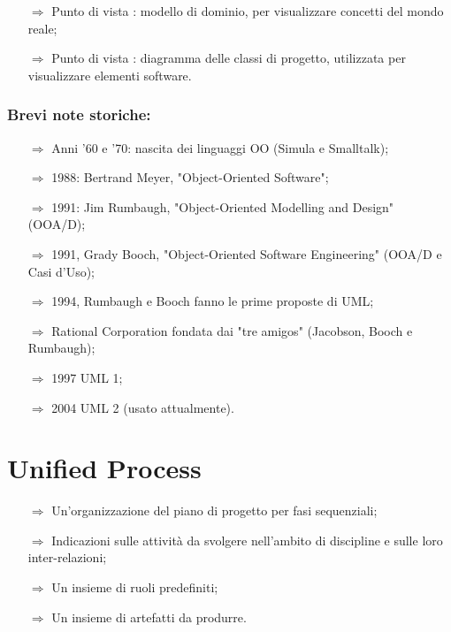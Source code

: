 \begin{itemize}
    \item [$\Rightarrow$] Punto di vista : modello 
    di dominio, per visualizzare concetti del mondo reale;
    \item [$\Rightarrow$] Punto di vista : diagramma
    delle classi di progetto, utilizzata per visualizzare elementi software.
\end{itemize}

\subsubsection{Brevi note storiche:}

\begin{itemize}
    \item [$\Rightarrow$] Anni '60 e '70: nascita dei linguaggi OO (Simula e Smalltalk);
    \item [$\Rightarrow$] 1988: Bertrand Meyer, "Object-Oriented Software";
    \item [$\Rightarrow$] 1991: Jim Rumbaugh, "Object-Oriented Modelling and Design" (OOA/D);
    \item [$\Rightarrow$] 1991, Grady Booch, "Object-Oriented Software Engineering" (OOA/D e Casi d'Uso);
    \item [$\Rightarrow$] 1994, Rumbaugh e Booch fanno le prime proposte di UML;
    \item [$\Rightarrow$] Rational Corporation fondata dai "tre amigos" (Jacobson, Booch e Rumbaugh);
    \item [$\Rightarrow$] 1997 UML 1;
    \item [$\Rightarrow$] 2004 UML 2 (usato attualmente).
\end{itemize}

\section{Unified Process}



\begin{itemize}
    \item [$\Rightarrow$] Un'organizzazione del piano di progetto
    per fasi sequenziali;
    \item [$\Rightarrow$] Indicazioni sulle attività da svolgere nell'ambito
    di discipline e sulle loro inter-relazioni;
    \item [$\Rightarrow$] Un insieme di ruoli predefiniti;
    \item [$\Rightarrow$] Un insieme di artefatti da produrre.
\end{itemize}

